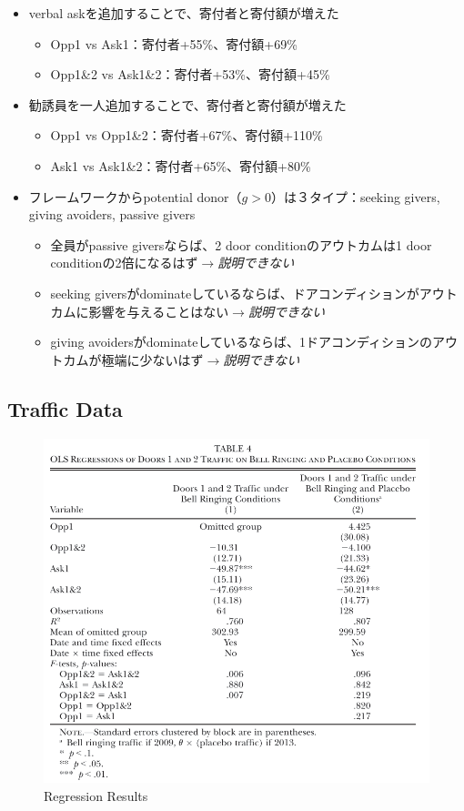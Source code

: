 \documentclass[../root]{subfiles}
\begin{document}
    \begin{itemize}
        \item verbal askを追加することで、寄付者と寄付額が増えた
        \begin{itemize}
            \item Opp1 vs Ask1：寄付者+55\%、寄付額+69\%
            \item Opp1\&2 vs Ask1\&2：寄付者+53\%、寄付額+45\%
        \end{itemize}
        \item 勧誘員を一人追加することで、寄付者と寄付額が増えた
        \begin{itemize}
            \item Opp1 vs Opp1\&2：寄付者+67\%、寄付額+110\%
            \item Ask1 vs Ask1\&2：寄付者+65\%、寄付額+80\%
        \end{itemize}
        \item フレームワークからpotential donor（$g > 0$）は３タイプ：seeking givers, giving avoiders, passive givers
        \begin{itemize}
            \item 全員がpassive giversならば、2 door conditionのアウトカムは1 door conditionの2倍になるはず$\to$\textit{説明できない}
            \item seeking giversがdominateしているならば、ドアコンディションがアウトカムに影響を与えることはない$\to$\textit{説明できない}
            \item giving avoidersがdominateしているならば、1ドアコンディションのアウトカムが極端に少ないはず$\to$\textit{説明できない}
        \end{itemize}
    \end{itemize}

    \subsection{Traffic Data}

    \begin{figure}[t]
        \centering
        \includegraphics[width=.8\linewidth]{0821kato/fig5_1.png}
        \caption{Regression Results}
        \label{}
    \end{figure}
\end{document}
